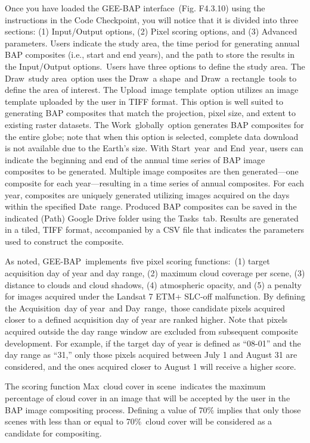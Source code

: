\documentclass[
  letterpaper,
  DIV=11,
  numbers=noendperiod]{scrreprt}
\begin{document}
Once you have loaded the GEE-BAP interface~(Fig. F4.3.10) using the
instructions in the Code Checkpoint, you will notice that it is divided
into three sections: (1) Input/Output options, (2) Pixel scoring
options, and (3) Advanced parameters. Users indicate the study area, the
time period for generating annual BAP composites (i.e., start and end
years), and the path to store the results in the Input/Output
options.~Users have three options to define the study area. The
Draw~study area~option uses the Draw~a shape~and Draw~a rectangle~tools
to define the area of interest. The Upload~image template~option
utilizes an image template uploaded by the user in TIFF format. This
option is well suited to generating BAP composites that match the
projection, pixel size, and extent to existing raster datasets. The
Work~globally~option generates BAP composites for the entire globe; note
that when this option is selected, complete data download is not
available due to the Earth's size. With Start~year~and End~year, users
can indicate the beginning and end of the annual time series of BAP
image composites to be generated. Multiple image composites are then
generated---one composite for each year---resulting in a time series of
annual composites. For each year, composites are uniquely generated
utilizing images acquired on the days within the specified Date~range.
Produced BAP composites can be saved in the indicated (Path) Google
Drive folder using the Tasks~tab. Results are generated in a tiled, TIFF
format, accompanied by a CSV file that indicates the parameters used to
construct the composite.

As noted, GEE-BAP~implements~five pixel scoring functions:~(1) target
acquisition day of year and day range, (2) maximum cloud coverage per
scene, (3) distance to clouds and cloud shadows, (4) atmospheric
opacity, and (5) a penalty for images acquired under the Landsat 7 ETM+
SLC-off malfunction. By defining the Acquisition~day of year~and
Day~range,~those candidate pixels acquired closer to a defined
acquisition day of year are ranked higher. Note that pixels acquired
outside the day range window are excluded from subsequent composite
development. For example, if the target day of year is defined as
``08-01'' and the day range as ``31,'' only those pixels acquired
between July 1 and August 31 are considered, and the ones acquired
closer to August 1 will receive a higher score.

The scoring function Max~cloud cover in scene~indicates the maximum
percentage of cloud cover in an image that will be accepted by the user
in the BAP image compositing process. Defining a value of 70\% implies
that only those scenes with less than or equal to 70\%~cloud cover will
be considered as a candidate for compositing.
\end{document}
